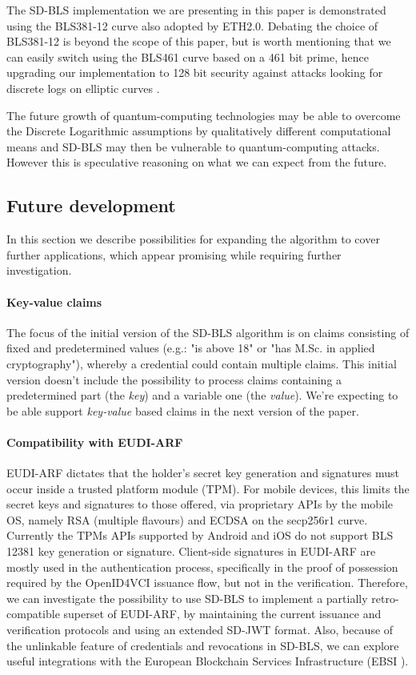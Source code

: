 \documentclass[conference]{IEEEtran}
\begin{document}
The SD-BLS implementation we are presenting in this paper is
demonstrated using the BLS381-12 curve \cite{bls381-12} also adopted
by ETH2.0. Debating the choice of BLS381-12 is beyond the scope of
this paper, but is worth mentioning that we can easily switch using the BLS461 curve based on a 461 bit prime, hence upgrading our
implementation to 128 bit security \cite{updating-key-pairings}
against attacks looking for discrete logs on elliptic curves
\cite{discrete-log-attack}.

The future growth
of quantum-computing technologies may be able to overcome the Discrete
Logarithmic assumptions by qualitatively different computational
means and SD-BLS may then be vulnerable to quantum-computing attacks. However this is speculative reasoning on what we can expect from the
future.

\subsection{Future development}
In this section we describe possibilities for expanding the algorithm to cover further applications, which appear promising while requiring further investigation.

\paragraph{Key-value claims}
The focus of the initial version of the SD-BLS algorithm is on claims consisting of fixed and predetermined values (e.g.: "is above 18" or "has M.Sc. in applied cryptography"), whereby a credential could contain multiple claims. This initial version doesn't include the possibility to process claims containing a predetermined part (the \textit{key}) and a variable one (the \textit{value}). We're expecting to be able support \textit{key-value} based claims in the next version of the paper.

\paragraph{Compatibility with EUDI-ARF}
EUDI-ARF dictates that the holder's secret key generation and signatures must occur inside a trusted platform module (TPM). For mobile devices, this limits the secret keys and signatures to those offered, via proprietary APIs by the mobile OS, namely RSA (multiple flavours) and ECDSA on the secp256r1 curve. Currently the TPMs APIs supported by Android and iOS do not support BLS 12381 key generation or signature.
Client-side signatures in EUDI-ARF are mostly used in the authentication process, specifically in the proof of possession required by the OpenID4VCI\cite{OID4VCI} issuance flow, but not in the verification.
Therefore, we can investigate the possibility to use SD-BLS to implement a partially retro-compatible superset of EUDI-ARF, by maintaining the current issuance and verification protocols and using an extended SD-JWT format. Also, because of the unlinkable feature of credentials and revocations in SD-BLS, we can explore useful integrations with the European Blockchain Services Infrastructure (EBSI \cite{ebsi}).
\end{document}
